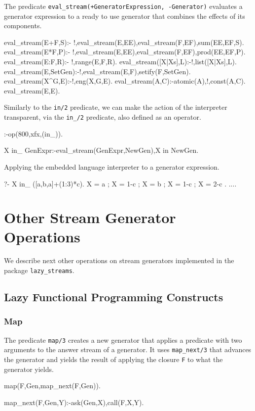 \documentclass{new_tlp}
\begin{document}
The predicate  {\tt eval\_stream(+GeneratorExpression, -Generator)}
evaluates a generator expression to a ready to use generator that combines 
the effects of its components.
\begin{code}
eval_stream(E+F,S):- !,eval_stream(E,EE),eval_stream(F,EF),sum(EE,EF,S).
eval_stream(E*F,P):- !,eval_stream(E,EE),eval_stream(F,EF),prod(EE,EF,P).
eval_stream(E:F,R):- !,range(E,F,R).
eval_stream([X|Xs],L):-!,list([X|Xs],L).
eval_stream({E},SetGen):-!,eval_stream(E,F),setify(F,SetGen).
eval_stream(X^G,E):-!,eng(X,G,E).
eval_stream(A,C):-atomic(A),!,const(A,C).
eval_stream(E,E).
\end{code}
Similarly to the {\tt in/2} predicate, we can make the action of the
interpreter transparent, via the {\tt in\_/2} predicate, also defined as an operator.
\begin{code}
:-op(800,xfx,(in_)).

X in_ GenExpr:-eval_stream(GenExpr,NewGen),X in NewGen.     
\end{code}

\BX
Applying the embedded language interpreter to a generator expression.
\begin{codex}
?- X in_ ({[a,b,a]}+(1:3)*c).
X = a ; X = 1-c ; X = b ; X = 1-c ; X = 2-c . ....
\end{codex}
\EX



\section{Other Stream Generator Operations}
We describe next other operations on stream generators
implemented in the package {\tt lazy\_streams}.

\subsection{Lazy Functional Programming Constructs}

\subsubsection{Map}

The predicate {\tt map/3} creates a new generator that
applies a predicate with two arguments to the answer stream  of a generator.
It uses {\tt map\_next/3} that advances the generator
and yields the result of applying the closure {\tt F} to what
the generator yields.
\begin{code}
map(F,Gen,map_next(F,Gen)).

map_next(F,Gen,Y):-ask(Gen,X),call(F,X,Y).
\end{code}
\end{document}
